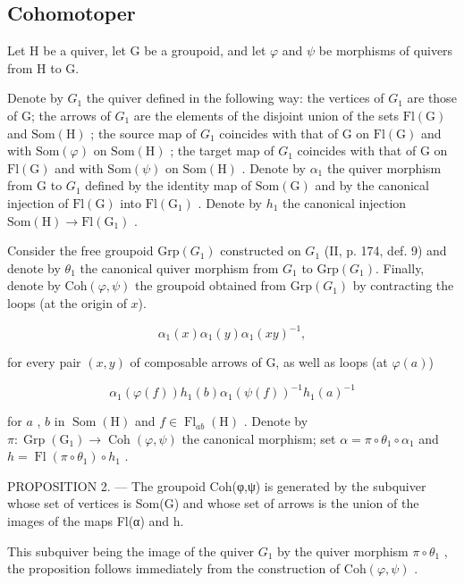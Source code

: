 \subsection{Cohomotoper}

Let H be a quiver, let G be a groupoid, and let \(\varphi\) and \(\psi\) be morphisms of quivers from H to G.

Denote by \(G_{1}\) the quiver defined in the following way: the vertices of \(G_{1}\) are those of G; the arrows of \(G_{1}\) are the elements of the disjoint union of the sets \(\mathrm{Fl(G)}\) and \(\mathrm{Som(H)}\) ; the source map of \(G_{1}\) coincides with that of G on \(\mathrm{Fl(G)}\) and with \(\mathrm{Som}(\varphi)\) on \(\mathrm{Som(H)}\) ; the target map of \(G_{1}\) coincides with that of G on \(\mathrm{Fl(G)}\) and with \(\mathrm{Som}(\psi)\) on \(\mathrm{Som(H)}\) . Denote by \(\alpha_{1}\) the quiver morphism from G to \(G_{1}\) defined by the identity map of \(\mathrm{Som(G)}\) and by the canonical injection of \(\mathrm{Fl(G)}\) into \(\mathrm{Fl(G_{1})}\) . Denote by \(h_{1}\) the canonical injection \(\mathrm{Som(H)} \to \mathrm{Fl(G_{1})}\) .

Consider the free groupoid \(\mathrm{Grp}(G_{1})\) constructed on \(G_{1}\) (II, p. 174, def. 9) and denote by \(\theta_{1}\) the canonical quiver morphism from \(G_{1}\) to \(\mathrm{Grp}(G_{1})\). Finally, denote by \(\mathrm{Coh}(\varphi,\psi)\) the groupoid obtained from \(\mathrm{Grp}(G_{1})\) by contracting the loops (at the origin of \(x\)).

\[
\alpha_ {1} (x) \alpha_ {1} (y) \alpha_ {1} (x y) ^ {- 1},\tag{1}
\]

for every pair \((x,y)\) of composable arrows of G, as well as loops (at \(\varphi(a)\))

\[
\alpha_ {1} (\varphi (f)) h _ {1} (b) \alpha_ {1} (\psi (f)) ^ {- 1} h _ {1} (a) ^ {- 1}\tag{2}
\]

for \(a\) , \(b\) in \(\operatorname{Som}(\mathrm{H})\) and \(f \in \operatorname{Fl}_{ab}(\mathrm{H})\) . Denote by \(\pi: \operatorname{Grp}(\mathrm{G}_1) \to \operatorname{Coh}(\varphi, \psi)\) the canonical morphism; set \(\alpha = \pi \circ \theta_1 \circ \alpha_1\) and \(h = \operatorname{Fl}(\pi \circ \theta_1) \circ h_1\) .

PROPOSITION 2. --- The groupoid Coh(φ,ψ) is generated by the subquiver whose set of vertices is Som(G) and whose set of arrows is the union of the images of the maps Fl(α) and h.

This subquiver being the image of the quiver \(G_{1}\) by the quiver morphism \(\pi \circ \theta_{1}\) , the proposition follows immediately from the construction of \(\mathrm{Coh}(\varphi, \psi)\) .

